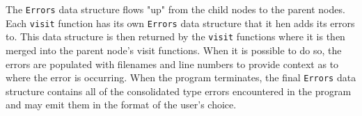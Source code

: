 \documentclass[10pt,twocolumn]{article}
\begin{document}
The \verb|Errors| data structure flows "up" from the child nodes to the parent nodes. Each \verb|visit| function has its own \verb|Errors| data structure that it hen adds its errors to. This data structure is then returned by the \verb|visit| functions where it is then merged into the parent node's visit functions. When it is possible to do so, the errors are populated with filenames and line numbers to provide context as to where the error is occurring. When the program terminates, the final \verb|Errors| data structure contains all of the consolidated type errors encountered in the program and may emit them in the format of the user's choice.
\printbibliography
\end{document}
